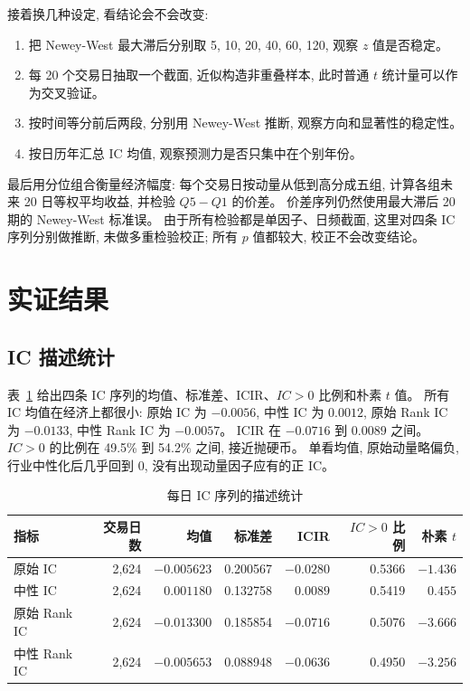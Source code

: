 \documentclass[11pt,a4paper]{article}
\begin{document}
接着换几种设定, 看结论会不会改变:

\begin{enumerate}
\item 把 Newey-West 最大滞后分别取 5, 10, 20, 40, 60, 120, 观察 $z$ 值是否稳定。
\item 每 20 个交易日抽取一个截面, 近似构造非重叠样本, 此时普通 $t$ 统计量可以作为交叉验证。
\item 按时间等分前后两段, 分别用 Newey-West 推断, 观察方向和显著性的稳定性。
\item 按日历年汇总 IC 均值, 观察预测力是否只集中在个别年份。
\end{enumerate}

最后用分位组合衡量经济幅度: 每个交易日按动量从低到高分成五组, 计算各组未来 20 日等权平均收益, 并检验 $Q5-Q1$ 的价差。
价差序列仍然使用最大滞后 20 期的 Newey-West 标准误。
由于所有检验都是单因子、日频截面, 这里对四条 IC 序列分别做推断, 未做多重检验校正; 所有 $p$ 值都较大, 校正不会改变结论。

\section{实证结果}

\subsection{IC 描述统计}

表~\ref{tab:icsummary} 给出四条 IC 序列的均值、标准差、ICIR、$IC>0$ 比例和朴素 $t$ 值。
所有 IC 均值在经济上都很小: 原始 IC 为 $-0.0056$, 中性 IC 为 $0.0012$, 原始 Rank IC 为 $-0.0133$, 中性 Rank IC 为 $-0.0057$。
ICIR 在 $-0.0716$ 到 $0.0089$ 之间。
$IC>0$ 的比例在 49.5\% 到 54.2\% 之间, 接近抛硬币。
单看均值, 原始动量略偏负, 行业中性化后几乎回到 0, 没有出现动量因子应有的正 IC。

\begin{table}[H]
\centering
\caption{每日 IC 序列的描述统计}
\label{tab:icsummary}
\begin{tabular}{lrrrrrr}
\toprule
指标 & 交易日数 & 均值 & 标准差 & ICIR & $IC>0$ 比例 & 朴素 $t$ \\
\midrule
原始 IC & 2{,}624 & $-0.005623$ & 0.200567 & $-0.0280$ & 0.5366 & $-1.436$ \\
中性 IC & 2{,}624 & $0.001180$ & 0.132758 & $0.0089$ & 0.5419 & $0.455$ \\
原始 Rank IC & 2{,}624 & $-0.013300$ & 0.185854 & $-0.0716$ & 0.5076 & $-3.666$ \\
中性 Rank IC & 2{,}624 & $-0.005653$ & 0.088948 & $-0.0636$ & 0.4950 & $-3.256$ \\
\bottomrule
\end{tabular}
\end{table}
\end{document}
